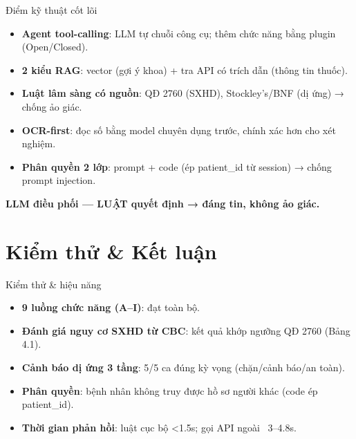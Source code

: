\documentclass[aspectratio=169,t]{beamer}
\begin{document}
\begin{frame}{Điểm kỹ thuật cốt lõi}
  \begin{itemize}
    \item \textbf{Agent tool-calling}: LLM tự chuỗi công cụ; thêm chức năng bằng plugin (Open/Closed).
    \item \textbf{2 kiểu RAG}: vector (gợi ý khoa) + tra API có trích dẫn (thông tin thuốc).
    \item \textbf{Luật lâm sàng có nguồn}: QĐ 2760 (SXHD), Stockley's/BNF (dị ứng) → chống ảo giác.
    \item \textbf{OCR-first}: đọc số bằng model chuyên dụng trước, chính xác hơn cho xét nghiệm.
    \item \textbf{Phân quyền 2 lớp}: prompt + code (ép patient\_id từ session) → chống prompt injection.
  \end{itemize}
  \vspace{0.2cm}
  \begin{center}\color{hustprimary}\large\textbf{LLM điều phối — LUẬT quyết định → đáng tin, không ảo giác.}\end{center}
\end{frame}

\section{Kiểm thử \& Kết luận}

\begin{frame}{Kiểm thử \& hiệu năng}
  \small
  \begin{itemize}
    \item \textbf{9 luồng chức năng (A–I)}: đạt toàn bộ.
    \item \textbf{Đánh giá nguy cơ SXHD từ CBC}: kết quả khớp ngưỡng QĐ 2760 (Bảng 4.1).
    \item \textbf{Cảnh báo dị ứng 3 tầng}: 5/5 ca đúng kỳ vọng (chặn/cảnh báo/an toàn).
    \item \textbf{Phân quyền}: bệnh nhân không truy được hồ sơ người khác (code ép patient\_id).
    \item \textbf{Thời gian phản hồi}: luật cục bộ <1.5s; gọi API ngoài ~3–4.8s.
  \end{itemize}
\end{frame}
\end{document}
